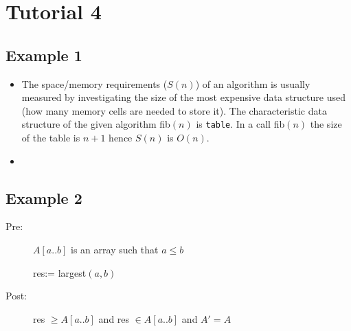\documentclass[english]{article}
\begin{document}

\pagestyle{fancy}
 \chead{}


\section*{Tutorial 4}

\subsection*{Example 1}
\begin{itemize}
\item The space/memory requirements ($S(n)$)
 of an algorithm is usually measured by investigating the size of the most expensive data structure used (how many memory cells are needed to store it).
The characteristic data structure of the given algorithm fib$(n)$ is
{\tt table}. 
In a call fib$(n)$ the size of the table is
$n+1$ hence $S(n)$ is $O(n)$.
\item
\begin{algorithmic}
  \ELSE
  \ENDIF
  \ENDFOR
\end{algorithmic}
\end{itemize}

\subsection*{Example 2}
\begin{description}
\item[Pre:] $A[a..b]$ is an array such that $a\leq b$
\item[] res:= largest$(a,b)$
\item[Post:] res $\geq A[a..b]$ and res $\in A[a..b]$ and $A'=A$
\\[4mm]
\begin{algorithmic}
  \ELSE
  \ENDIF
\end{algorithmic}
\end{description}
\end{document}
